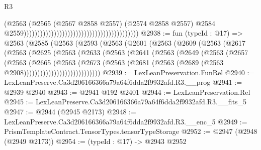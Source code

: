 \begin{lexlean}{R3}
\begin{coremodule}
                                                                                    (@2563
                                                                                      (@2565
                                                                                        (@2567
                                                                                          @2858
                                                                                          @2557)
                                                                                        (@2574
                                                                                          @2858
                                                                                          @2557)
                                                                                        @2584
                                                                                        @2559))))))))))))))))))))))))))))))))))))))))))
@2938 := fun (typeId : @17) =>
  @2563
    (@2585
      (@2563
        (@2593
          (@2563
            (@2601
              (@2563
                (@2609
                  (@2563
                    (@2617
                      (@2563
                        (@2625
                          (@2563
                            (@2633
                              (@2563
                                (@2641
                                  (@2563
                                    (@2649
                                      (@2563
                                        (@2657
                                          (@2563
                                            (@2665
                                              (@2563
                                                (@2673
                                                  (@2563
                                                    (@2681
                                                      (@2563
                                                        (@2689
                                                          (@2563 @2908))))))))))))))))))))))))))))
@2939 := LexLeanPreservation.FunRel
@2940 := LexLeanPreserve.Ca3d206166366a79a64f6dda2f9932afd.R3.__prog
@2941 := @2939 @2940
@2943 := @2941 @192 @2401
@2944 := LexLeanPreservation.Rel
@2945 := LexLeanPreserve.Ca3d206166366a79a64f6dda2f9932afd.R3.__fits_5
@2947 := @2944 (@2945 @2173)
@2948 := LexLeanPreserve.Ca3d206166366a79a64f6dda2f9932afd.R3.__enc_5
@2949 := PrismTemplateContract.TensorTypes.tensorTypeStorage
@2952 := @2947 (@2948 (@2949 @2173))
@2954 := (typeId : @17) -> @2943 @2952

\end{coremodule}
\end{lexlean}
